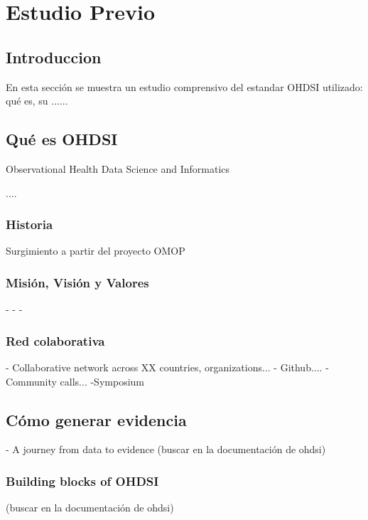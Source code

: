 \chapter{Estudio Previo}\label{cap:estudio}

\section{Introduccion}

En esta sección se muestra un estudio comprensivo del estandar OHDSI utilizado: qué es, su ......

\section{Qué es OHDSI}

Observational Health Data Science and Informatics

....

\subsection{Historia}

Surgimiento a partir del proyecto OMOP

\subsection{Misión, Visión y Valores}

-
-
-

\subsection{Red colaborativa}

- Collaborative network across XX countries, organizations...
- Github....
- Community calls...
-Symposium

\section{Cómo generar evidencia}

- A journey from data to evidence (buscar en la documentación de ohdsi)

\subsection{Building blocks of OHDSI}

(buscar en la documentación de ohdsi)

